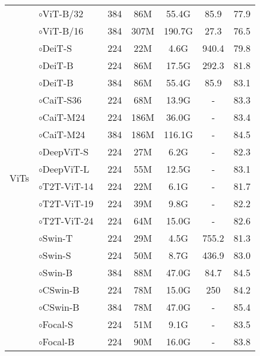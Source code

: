 \documentclass[runningheads]{llncs}
\begin{document}
\begin{table}[!t]
\begin{tabular}{c|l|ccccc}
\multirow{20}{*}{ViTs} &
\textcolor{brickred}{$\circ$}ViT-B/32~\cite{dosovitskiy2020image} & 384 & 86M & 55.4G & 85.9 & 77.9 \\
& \textcolor{brickred}{$\circ$}ViT-B/16~\cite{dosovitskiy2020image} & 384 & 307M & 190.7G & 27.3 & 76.5 \\
& \textcolor{brickred}{$\circ$}DeiT-S~\cite{touvron2021training} & 224 & 22M & 4.6G & 940.4 & 79.8 \\
& \textcolor{brickred}{$\circ$}DeiT-B~\cite{touvron2021training} & 224 & 86M & 17.5G & 292.3 & 81.8 \\
& \textcolor{brickred}{$\circ$}DeiT-B~\cite{touvron2021training} & 384 & 86M & 55.4G & 85.9 & 83.1 \\
& \textcolor{brickred}{$\circ$}CaiT-S36~\cite{touvron2021going} & 224 & 68M & 13.9G & - & 83.3 \\
& \textcolor{brickred}{$\circ$}CaiT-M24~\cite{touvron2021going} & 224 & 186M & 36.0G & - & 83.4 \\
& \textcolor{brickred}{$\circ$}CaiT-M24~\cite{touvron2021going} & 384 & 186M & 116.1G & - & 84.5 \\
& \textcolor{brickred}{$\circ$}DeepViT-S~\cite{zhou2021deepvit} & 224 & 27M & 6.2G & - & 82.3 \\
& \textcolor{brickred}{$\circ$}DeepViT-L~\cite{zhou2021deepvit} & 224 & 55M & 12.5G & - & 83.1 \\
& \textcolor{brickred}{$\circ$}T2T-ViT-14~\cite{yuan2021tokens} & 224 & 22M & 6.1G & - & 81.7 \\
& \textcolor{brickred}{$\circ$}T2T-ViT-19~\cite{yuan2021tokens} & 224 & 39M & 9.8G & - & 82.2 \\
& \textcolor{brickred}{$\circ$}T2T-ViT-24~\cite{yuan2021tokens} & 224 & 64M & 15.0G & - & 82.6 \\
& \textcolor{brickred}{$\circ$}Swin-T~\cite{liu2021swin} & 224 & 29M & 4.5G & 755.2 & 81.3 \\
& \textcolor{brickred}{$\circ$}Swin-S~\cite{liu2021swin} & 224 & 50M & 8.7G & 436.9 & 83.0 \\
& \textcolor{brickred}{$\circ$}Swin-B~\cite{liu2021swin} & 384 & 88M & 47.0G & 84.7 & 84.5 \\
& \textcolor{brickred}{$\circ$}CSwin-B~\cite{dong2021cswin} & 224 & 78M & 15.0G & 250 & 84.2 \\
& \textcolor{brickred}{$\circ$}CSwin-B~\cite{dong2021cswin} & 384 & 78M & 47.0G & - & 85.4 \\
& \textcolor{brickred}{$\circ$}Focal-S~\cite{yang2021focal} & 224 & 51M & 9.1G & - & 83.5 \\
& \textcolor{brickred}{$\circ$}Focal-B~\cite{yang2021focal} & 224 & 90M & 16.0G & - & 83.8 \\
\midrule


\end{tabular}
\end{table}
\end{document}
